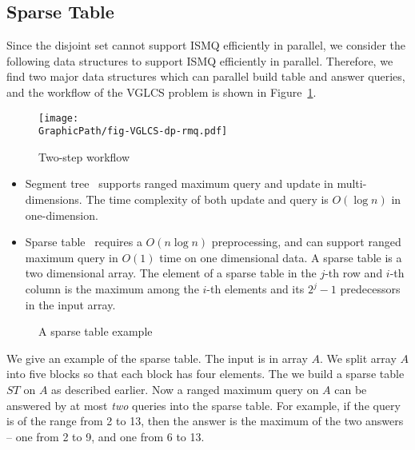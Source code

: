 \subsection{Sparse Table}

Since the disjoint set cannot support ISMQ efficiently in parallel, we
consider the following data structures to support ISMQ efficiently in
parallel.  Therefore, we find two major data structures which can
parallel build table and answer queries, and the workflow of the VGLCS
problem is shown in Figure~\ref{fig:fig-VGLCS-dp-rmq}.


\begin{figure}
  \texttt{[image: \\GraphicPath/fig-VGLCS-dp-rmq.pdf]}
  \caption{Two-step workflow}
  \label{fig:fig-VGLCS-dp-rmq}
\end{figure}


\begin{itemize}
  \item Segment tree~\cite{berg2000computational} supports ranged
    maximum query and update in multi-dimensions.  The time complexity
    of both update and query is $O(\log n)$ in one-dimension.
  \item Sparse table~\cite{Berkman1993RecursiveSP} requires a $O(n
    \log n)$ preprocessing, and can support ranged maximum query in
    $O(1)$ time on one dimensional data.  A sparse table is a two
    dimensional array.  The element of a sparse table in the $j$-th
    row and $i$-th column is the maximum among the $i$-th elements
    and its $2^j - 1$ predecessors in the input array.
\end{itemize}

\begin{figure}[!thb]
  \centering {} 
  \caption{A sparse table example}
  \label{fig:interval-decomposition}
\end{figure}

We give an example of the sparse table.  The input is in array $A$. We
split array $A$ into five blocks so that each block has four elements.
The we build a sparse table $ST$ on $A$ as described earlier.  Now a
ranged maximum query on $A$ can be answered by at most {\em two}
queries into the sparse table.  For example, if the query is of the
range from 2 to 13, then the answer is the maximum of the two answers
-- one from 2 to 9, and one from 6 to 13.

